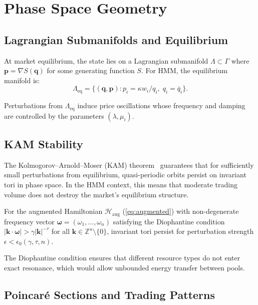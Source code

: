 \section{Phase Space Geometry}

\label{sec:geometry}

\subsection{Lagrangian Submanifolds and Equilibrium}

At market equilibrium, the state lies on a Lagrangian submanifold $\Lambda \subset \Gamma$ where $\bm{p} = \nabla S(\bm{q})$ for some generating function $S$. For HMM, the equilibrium manifold is:
\begin{equation}
\Lambda_{\text{eq}} = \{(\bm{q}, \bm{p}) : p_i = \kappa w_i / q_i, \; q_i = \bar{q}_i\}.
\end{equation}

Perturbations from $\Lambda_{\text{eq}}$ induce price oscillations whose frequency and damping are controlled by the parameters $(\lambda, \mu_i)$.

\subsection{KAM Stability}

The Kolmogorov--Arnold--Moser (KAM) theorem~\cite{arnold1963proof} guarantees that for sufficiently small perturbations from equilibrium, quasi-periodic orbits persist on invariant tori in phase space. In the HMM context, this means that moderate trading volume does not destroy the market's equilibrium structure.

\begin{theorem}
For the augmented Hamiltonian $\mathcal{H}_{\text{aug}}$ (\ref{eq:augmented}) with non-degenerate frequency vector $\bm{\omega} = (\omega_1, \ldots, \omega_n)$ satisfying the Diophantine condition $|\bm{k} \cdot \bm{\omega}| > \gamma |\bm{k}|^{-\tau}$ for all $\bm{k} \in \mathbb{Z}^n \setminus \{0\}$, invariant tori persist for perturbation strength $\epsilon < \epsilon_0(\gamma, \tau, n)$.
\end{theorem}

The Diophantine condition ensures that different resource types do not enter exact resonance, which would allow unbounded energy transfer between pools.

\subsection{Poincar\'e Sections and Trading Patterns}

